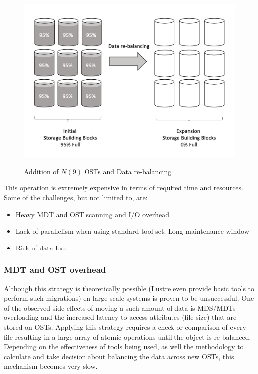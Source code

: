 \documentclass{article}
\begin{document}
\begin{figure}[h]
    \centering
    \includegraphics[scale=0.37]{full-rebalance.png}\\[0.5cm] 
    \caption{Addition of $N (9)$ OSTs and Data re-balancing}
    \label{fig:full-rebalance strategy}
\end{figure}


This operation is extremely expensive in terms of required time and resources. Some of the challenges, but not limited to, are: 
\begin{itemize}
    \item Heavy MDT and OST scanning and I/O overhead
    \item Lack of parallelism when using standard tool set. Long maintenance window
    \item Risk of data loss
\end{itemize}

\subsubsection{MDT and OST overhead}
Although this strategy is theoretically possible (Lustre even provide basic tools to perform such migrations) on large scale systems is proven to be unsuccessful. One of the observed side effects of moving a such amount of data is  MDS/MDTs overloading and the increased latency to access attributes (file size) that are stored on OSTs. Applying this strategy requires a check or comparison of every file resulting in a large array of atomic operations until the object is re-balanced. Depending on the effectiveness of tools being used, as well the methodology to calculate and take decision about balancing the data across new OSTs, this mechanism becomes very slow.
\end{document}
